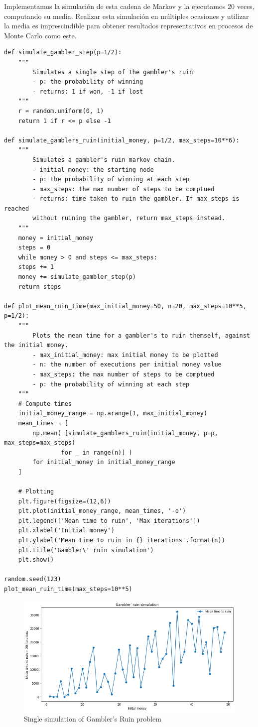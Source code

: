 \documentclass[a4paper]{article}
\begin{document}
Implementamos la simulación de esta cadena de Markov y la ejecutamos $20$ veces, computando su media. Realizar esta simulación en múltiples ocasiones y utilizar la media es imprescindible para obtener resultados representativos en procesos de Monte Carlo como este.
	
\begin{verbatim}
def simulate_gambler_step(p=1/2):
	""" 
		Simulates a single step of the gambler's ruin
		- p: the probability of winning
		- returns: 1 if won, -1 if lost
	"""
	r = random.uniform(0, 1)
	return 1 if r <= p else -1

def simulate_gamblers_ruin(initial_money, p=1/2, max_steps=10**6):
	"""
		Simulates a gambler's ruin markov chain.
		- initial_money: the starting node
		- p: the probability of winning at each step
		- max_steps: the max number of steps to be comptued
		- returns: time taken to ruin the gambler. If max_steps is reached
		without ruining the gambler, return max_steps instead.
	"""
	money = initial_money
	steps = 0
	while money > 0 and steps <= max_steps:
	steps += 1
	money += simulate_gambler_step(p)
	return steps

def plot_mean_ruin_time(max_initial_money=50, n=20, max_steps=10**5, p=1/2):
	"""
		Plots the mean time for a gambler's to ruin themself, against the initial money.
		- max_initial_money: max initial money to be plotted
		- n: the number of executions per initial money value
		- max_steps: the max number of steps to be comptued
		- p: the probability of winning at each step
	"""
	# Compute times
	initial_money_range = np.arange(1, max_initial_money)
	mean_times = [
		np.mean( [simulate_gamblers_ruin(initial_money, p=p, max_steps=max_steps)
				for _ in range(n)] )
		for initial_money in initial_money_range
	]

	# Plotting
	plt.figure(figsize=(12,6))
	plt.plot(initial_money_range, mean_times, '-o')
	plt.legend(['Mean time to ruin', 'Max iterations'])
	plt.xlabel('Initial money')
	plt.ylabel('Mean time to ruin in {} iterations'.format(n))
	plt.title('Gambler\' ruin simulation')
	plt.show()
	
random.seed(123)
plot_mean_ruin_time(max_steps=10**5)
\end{verbatim}
	
\begin{figure}[H]
	\includegraphics[scale=.14]{figures/gambler1}
	\centering
	\caption{Single simulation of Gambler's Ruin problem}
\end{figure}
\end{document}
